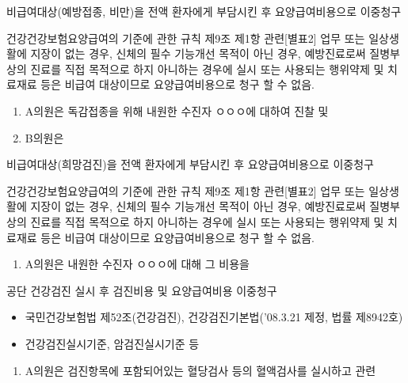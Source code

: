 비급여대상(예방접종, 비만)을 전액 환자에게 부담시킨 후 요양급여비용으로 이중청구
\begin{description}\tightlist
\item[관련근거] 건강건강보험요양급여의 기준에 관한 규칙 제9조 제1항 관련[별표2] 업무 또는 일상생활에 지장이 없는 경우, 신체의 필수 기능개선 목적이 아닌 경우, 예방진료로써 질병\cntrdot{}부상의 진료를 직접 목적으로 하지 아니하는 경우에 실시 또는 사용되는 행위\cntrdot{}약제 및 치료재료 등은 비급여 대상이므로 요양급여비용으로 청구 할 수 없음.
\item[부당사례]
\begin{enumerate}[1)]\tightlist
\item  A의원은 독감접종을 위해 내원한 수진자 ㅇㅇㅇ에 대하여 진찰 및 
\item B의원은 
\end{enumerate}
\end{description}

비급여대상(희망검진)을 전액 환자에게 부담시킨 후 요양급여비용으로 이중청구
\begin{description}\tightlist
\item[관련근거] 건강건강보험요양급여의 기준에 관한 규칙 제9조 제1항 관련[별표2] 업무 또는 일상생활에 지장이 없는 경우, 신체의 필수 기능개선 목적이 아닌 경우, 예방진료로써 질병\cntrdot{}부상의 진료를 직접 목적으로 하지 아니하는 경우에 실시 또는 사용되는 행위\cntrdot{}약제 및 치료재료 등은 비급여 대상이므로 요양급여비용으로 청구 할 수 없음.
\item[부당사례]
\begin{enumerate}[1)]\tightlist
\item  A의원은  내원한 수진자 ㅇㅇㅇ에 대해 그 비용을 
\end{enumerate}
\end{description}

\begin{commentbox}{공단 건강검진 실시 후 검진비용 및 요양급여비용 이중청구}
\begin{description}\tightlist
\item[관련근거] 
\begin{itemize}\tightlist
\item 국민건강보험법 제52조(건강검진), 건강검진기본법('08.3.21 제정, 법률 제8942호)
\item 건강검진실시기준, 암검진실시기준 등
\end{itemize}
\item[부당사례]
\begin{enumerate}[1)]\tightlist
\item  A의원은 검진항목에 포함되어있는 혈당검사 등의 혈액검사를 실시하고 관련 
\end{enumerate}
\end{description}
\end{commentbox}
